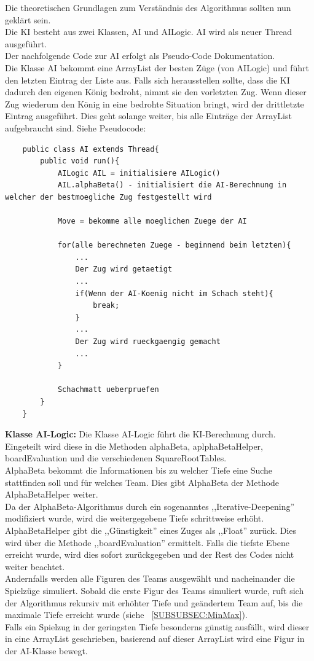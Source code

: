 \documentclass[12pt,a4paper]{article}
\begin{document}
{Die theoretischen Grundlagen zum Verständnis des Algorithmus sollten nun geklärt sein.\\
Die KI besteht aus zwei Klassen, AI und AILogic. AI wird als neuer Thread ausgeführt. \\
Der nachfolgende Code zur AI erfolgt als Pseudo-Code Dokumentation.\\
Die Klasse AI bekommt eine ArrayList der besten Züge (von AILogic) und führt den letzten Eintrag der Liste aus. Falls sich herausstellen sollte, dass die KI dadurch den eigenen König bedroht, nimmt sie den vorletzten Zug. Wenn dieser Zug wiederum den König in eine bedrohte Situation bringt, wird der drittletzte Eintrag ausgeführt. Dies geht solange weiter, bis alle Einträge der ArrayList aufgebraucht sind. Siehe Pseudocode:

\lstset{language=Java}
\begin{lstlisting}
	public class AI extends Thread{
		public void run(){
			AILogic AIL = initialisiere AILogic()
			AIL.alphaBeta() - initialisiert die AI-Berechnung in welcher der bestmoegliche Zug festgestellt wird
			
			Move = bekomme alle moeglichen Zuege der AI
			
			for(alle berechneten Zuege - beginnend beim letzten){
				...
				Der Zug wird getaetigt
				...
				if(Wenn der AI-Koenig nicht im Schach steht){					
					break;
				}
				...
				Der Zug wird rueckgaengig gemacht
				...
			}
			
			Schachmatt ueberpruefen
		}
	}	
\end{lstlisting}
\newpage
\textbf{Klasse AI-Logic:} Die Klasse AI-Logic führt die KI-Berechnung durch. Eingeteilt wird diese in die Methoden alphaBeta, aplphaBetaHelper, boardEvaluation und die verschiedenen SquareRootTables.\\
AlphaBeta bekommt die Informationen bis zu welcher Tiefe eine Suche stattfinden soll und für welches Team. Dies gibt AlphaBeta der Methode AlphaBetaHelper weiter. \\
 Da der AlphaBeta-Algorithmus durch ein sogenanntes ,,Iterative-Deepening'' modifiziert wurde, wird die weitergegebene Tiefe schrittweise erhöht. \\
 AlphaBetaHelper gibt die ,,Günstigkeit'' eines Zuges als ,,Float'' zurück. Dies wird über die Methode ,,boardEvaluation'' ermittelt. Falls die tiefste Ebene erreicht wurde, wird dies sofort zurückgegeben und der Rest des Codes nicht weiter beachtet. \\
 Andernfalls werden alle Figuren des Teams ausgewählt und nacheinander die Spielzüge simuliert. Sobald die erste Figur des Teams simuliert wurde, ruft sich der Algorithmus rekursiv mit erhöhter Tiefe und geändertem Team auf, bis die maximale Tiefe erreicht wurde (siehe ~\ref{SUBSUBSEC:MinMax}). \\
 Falls ein Spielzug in der geringsten Tiefe besonderns günstig ausfällt, wird dieser in eine ArrayList geschrieben, basierend auf dieser ArrayList wird eine Figur in der AI-Klasse bewegt. \\
 
}
\end{document}
